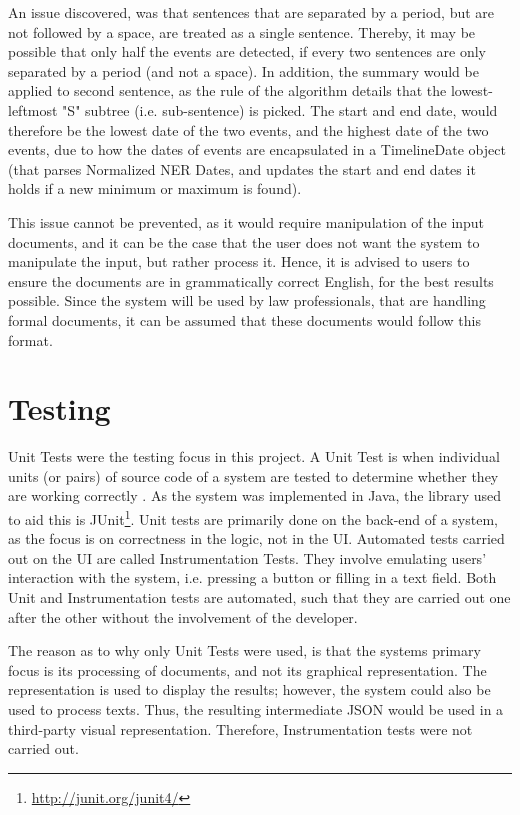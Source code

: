 \par An issue discovered, was that sentences that are separated by a period, but are not followed by a space, are treated as a single sentence. Thereby, it may be possible that only half the events are detected, if every two sentences are only separated by a period (and not a space). In addition, the summary would be applied to second sentence, as the rule of the algorithm details that the lowest-leftmost "S" subtree (i.e. sub-sentence) is picked. The start and end date, would therefore be the lowest date of the two events, and the highest date of the two events, due to how the dates of events are encapsulated in a TimelineDate object (that parses Normalized NER Dates, and updates the start and end dates it holds if a new minimum or maximum is found).

\par This issue cannot be prevented, as it would require manipulation of the input documents, and it can be the case that the user does not want the system to manipulate the input, but rather process it. Hence, it is advised to users to ensure the documents are in grammatically correct English, for the best results possible. Since the system will be used by law professionals, that are handling formal documents, it can be assumed that these documents would follow this format.


\section{Testing}
\par Unit Tests were the testing focus in this project. A Unit Test is when individual units (or pairs) of source code of a system are tested to determine whether they are working correctly \cite{agilealliance2017}. As the system was implemented in Java, the library used to aid this is JUnit\footnote{\url{http://junit.org/junit4/}}. Unit tests are primarily done on the back-end of a system, as the focus is on correctness in the logic, not in the UI. Automated tests carried out on the UI are called Instrumentation Tests. They involve emulating users' interaction with the system, i.e. pressing a button or filling in a text field. Both Unit and Instrumentation tests are automated, such that they are carried out one after the other without the involvement of the developer.

\par The reason as to why only Unit Tests were used, is that the systems primary focus is its processing of documents, and not its graphical representation. The representation is used to display the results; however, the system could also be used to process texts. Thus, the resulting intermediate JSON would be used in a third-party visual representation. Therefore, Instrumentation tests were not carried out.

